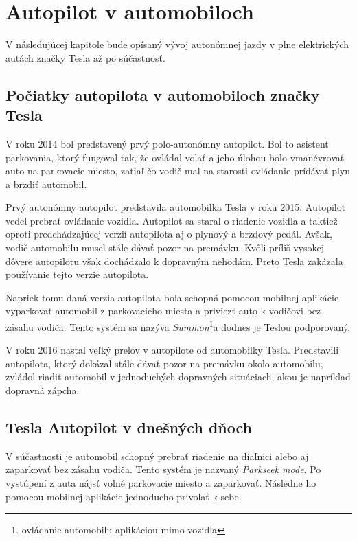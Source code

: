 \documentclass[10pt,twoside,slovak,a4paper]{article}
\begin{document}
\section{Autopilot v automobiloch}

V následujúcej kapitole bude opísaný vývoj autonómnej jazdy v plne elektrických autách značky Tesla až po súčastnosť.

\subsection{Počiatky autopilota v automobiloch značky Tesla}

V roku 2014 bol predstavený prvý polo-autonómny autopilot. Bol to asistent parkovania, ktorý fungoval tak, že ovládal volať a jeho úlohou bolo vmanévrovať auto na parkovacie miesto, zatiaľ čo vodič mal na starosti ovládanie prídávať plyn a brzdiť automobil. 

Prvý autonómny autopilot predstavila automobilka Tesla v roku 2015. Autopilot vedel prebrať ovládanie vozidla. Autopilot sa staral o riadenie vozidla a taktiež oproti predchádzajúcej verzií autopilota aj o plynový a brzdový pedál. Avšak, vodič automobilu musel stále dávať pozor na premávku. Kvôli príliš vysokej dôvere autopilotu však dochádzalo k dopravným nehodám. Preto Tesla zakázala používanie tejto verzie autopilota.

Napriek tomu daná verzia autopilota bola schopná pomocou mobilnej aplikácie vyparkovať automobil z parkovacieho miesta a priviezť auto k vodičovi bez zásahu vodiča. Tento systém sa nazýva \emph{Summon}\footnote{ovládanie automobilu aplikáciou mimo vozidla}a dodnes je Teslou podporovaný.

V roku 2016 nastal veľký prelov v autopilote od automobilky Tesla. Predstavili autopilota, ktorý dokázal stále dávať pozor na premávku okolo automobilu, zvládol riadiť automobil v jednoduchých dopravných situáciach, akou je napríklad dopravná zápcha. \cite{TeslaAutopilot}

\subsection{Tesla Autopilot v dnešných dňoch}

V súčastnosti je automobil schopný prebrať riadenie na diaľnici alebo aj zaparkovať bez zásahu vodiča. Tento systém je nazvaný \emph{Parkseek mode}. Po vystúpení z auta nájsť voľné parkovacie miesto a zaparkovať. Následne ho pomocou mobilnej aplikácie jednoducho privolať k sebe. 
\end{document}

